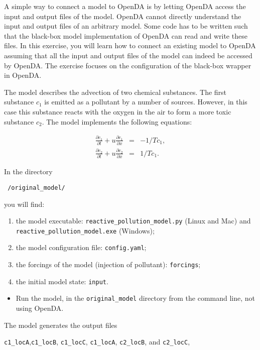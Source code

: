 A simple way to connect a model to OpenDA is by letting OpenDA access the input
and output files of the model. OpenDA cannot directly understand the input and
output files of an arbitrary model. Some code has to be written such that the
black-box model implementation of OpenDA can read and write these files. In
this exercise, you will learn how to connect an existing model to OpenDA
assuming that all the input and output files of the model can indeed be
accessed by OpenDA. The exercise focuses on the configuration of the black-box
wrapper in OpenDA.

The model describes
the advection of two chemical substances. The first substance $c_1$ is emitted
as a pollutant by a number of sources. However, in this case this substance reacts
with the oxygen in the air to form a more toxic substance $c_2$. The model
implements the following equations:

\begin{eqnarray}
    \frac{\partial c_1}{\partial t} + u\frac{\partial c_1}{\partial x} & = & -
    1/T c_1, \\
    \frac{\partial c_2}{\partial t} + u\frac{\partial c_2}{\partial x} & = &
    1/T c_1.
\end{eqnarray}


In the directory 

{\tt { \opgave}/original\_model/}

you will find:
\begin{enumerate}
	\item the model executable: {\tt reactive\_pollution\_model.py} (Linux and Mac)
	      and  {\tt reactive\_pollution\_model.exe} (Windows);
	\item the model configuration file: {\tt config.yaml};
        \item the forcings of the model (injection of pollutant): {\tt forcings};
	\item the initial model state: {\tt input}.
\end{enumerate}


\begin{itemize}
	\item Run the model, in the {\tt original\_model} directory from the
	      command line, not using OpenDA.
\end{itemize}
The model generates the output files 

{\tt c1\_locA},{\tt c1\_locB}, {\tt c1\_locC}, {\tt c1\_locA}, {\tt c2\_locB}, and {\tt c2\_locC},

